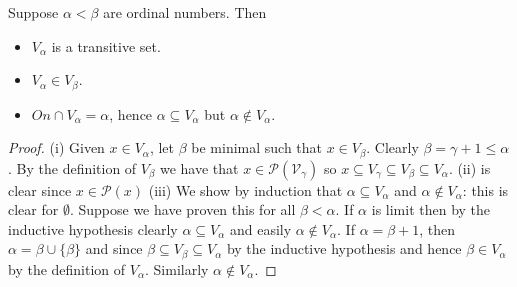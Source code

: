 \begin{fact}\label{valphaFact} Suppose $\alpha<\beta$ are ordinal numbers. Then
 \begin{itemize}
  \item[(i)] $V_\alpha$ is a transitive set.
  \item[(ii)] $V_\alpha\in V_\beta$.
  \item[(iii)] $On\cap V_\alpha = \alpha$, hence $\alpha\subseteq V_\alpha$ but
	$\alpha\not\in V_\alpha$.
 \end{itemize}
\end{fact}
\begin{proof} (i) Given $x\in V_\alpha$, let $\beta$ be minimal such that $x\in V_\beta$. Clearly $\beta=\gamma+1\leq\alpha$. By the definition of
$V_\beta$ we have that $x\in \mathcal{P(V_\gamma)}$ so $x\subseteq V_\gamma\subseteq V_\beta\subseteq V_\alpha$. (ii) is clear since
$x\in\mathcal{P}(x)$ (iii) We show by induction that $\alpha\subseteq V_\alpha$ and $\alpha\not\in V_\alpha$: this is clear for $\emptyset$. Suppose we
have proven this for all $\beta<\alpha$. If $\alpha$ is limit then by the inductive hypothesis clearly $\alpha\subseteq V_\alpha$ and
easily $\alpha\not\in V_\alpha$. If $\alpha=\beta+1$, then $\alpha=\beta\cup\{\beta\}$ and since $\beta\subseteq V_\beta\subseteq V_\alpha$
by the inductive hypothesis and hence $\beta\in V_\alpha$ by the definition of $V_\alpha$. Similarly $\alpha\not\in V_\alpha$.
\end{proof}


